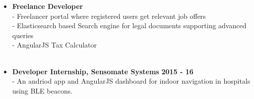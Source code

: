 \documentclass[a4paper,10pt]{article}
\newcommand{\when}[1]{\hfill \textbf{#1}}
\newenvironment{noSepItemize}
{ \begin{itemize}
    \setlength{\itemsep}{1pt}
    \setlength{\parskip}{0pt}
    \setlength{\parsep}{0pt}     }
{ \end{itemize}                  }
\begin{document}
\begin{noSepItemize}
	\\ \indent \indent - Implemented auto tracking of work items via Trello API for easier work overview.
	\\ \indent \indent - Automated logging and mailing of work processes completed over the week for easier accessibility.
\\\item \noindent \textbf{Freelance Developer}\\
	\indent - Freelancer portal where registered users get relevant job offers\\
	\indent - Elasticsearch based Search engine for legal documents supporting advanced queries\\
	\indent - AngularJS Tax Calculator\\
\\\item \noindent \textbf{Developer Internship, Sensomate Systems} \when{2015 - 16}\\
	\indent - An andriod app and AngularJS dashboard for indoor navigation in hospitals using BLE beacons.
\end{noSepItemize}
\end{document}

